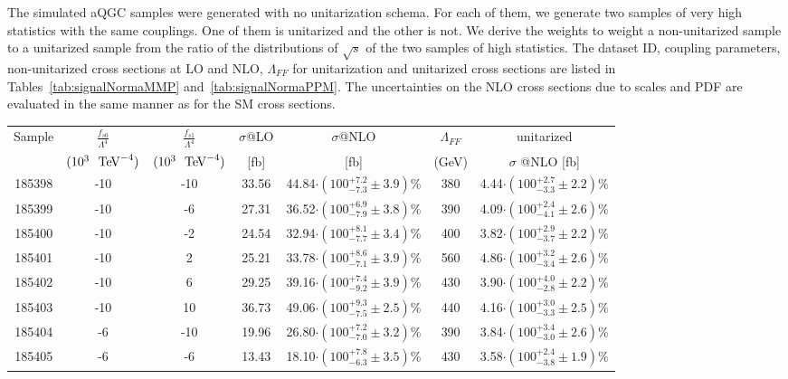 The simulated aQGC samples were generated with no unitarization schema. For
each of them, we generate two samples of very high statistics with the
same couplings. One of them is unitarized and the other is not. We
derive the weights to weight a non-unitarized sample to a unitarized
sample from the ratio of the distributions of $\sqrt{s}$ of the two
samples of high statistics. The dataset ID, coupling parameters,
non-unitarized cross sections at LO and NLO, $\Lambda_{FF}$ for
unitarization and unitarized cross sections are listed in
Tables~\ref{tab:signalNormaMMP} and~\ref{tab:signalNormaPPM}. The uncertainties on the NLO cross
sections due to scales and PDF are evaluated in the same manner as for
the SM cross sections.
\begin{table}[ht!]
  \centering
  {
\renewcommand{\arraystretch}{1.3}
\begin{tabular}{c|c|c|c|c|c|c}
  \hline
  Sample & $\frac{f_{s0}}{\Lambda^4} $ & $\frac{f_{s1}}{\Lambda^4} $ & $\sigma$@LO  & $\sigma$@NLO & $\Lambda_{FF}$  & unitarized  \\
     & $(10^3~\TeV^{-4})$ & $(10^3~\TeV^{-4})$ & [fb] & [fb] &  (GeV) & $\sigma$ @NLO [fb] \\
\hline \hline
185398 & -10 &	-10 & 33.56 &         44.84$\cdot (100^{+7.2}_{-7.3}\pm3.9  )$\% &           380    &       4.44$\cdot (100^{+2.7}_{-3.3}\pm 2.2)\%$ \\
185399 &  -10 &	-6  &     27.31 &     36.52$\cdot (100^{+6.9}_{-7.9}\pm 3.8 )$\% &      390   &        4.09$\cdot (100^{+2.4}_{-4.1}\pm 2.6 )\%$  \\
185400 &  -10  &  -2  &  24.54  &     32.94$\cdot (100^{+8.1}_{-7.7}\pm3.4  )$\%  &     400      &            3.82$\cdot (100^{+2.9}_{-3.7}\pm 2.2)$\% \\ 
185401 & -10   &  2   &  25.21   &    33.78$\cdot (100^{+8.6}_{-7.1}\pm3.9 )$\%   &    560       &           4.86$\cdot (100^{+3.2}_{-3.4}\pm 2.6)$\%\\ 
185402 & -10   &  6   &  29.25   &    39.16$\cdot (100^{+7.4}_{-9.2}\pm3.9  )$\%   &    430       &           3.90$\cdot (100^{+4.0}_{-2.8}\pm 2.2)$\%\\
185403 & -10   &  10  &  36.73   &    49.06$\cdot (100^{+9.3}_{-7.5}\pm2.5 )$\%   &    440       &           4.16$\cdot (100^{+3.0}_{-3.3}\pm 2.5 )$\% \\
\hline
185404 & -6    &  -10 &  19.96   &    26.80$\cdot (100^{+7.2}_{-7.0}\pm 3.2 )$\%    &   390       &           3.84$\cdot (100^{+3.4}_{-3.0}\pm 2.6)$\% \\ 
185405 & -6    &  -6  &  13.43   &    18.10$\cdot (100^{+7.8}_{-6.3}\pm 3.5 )$\%    &   430       &           3.58$\cdot (100^{+2.4}_{-3.8}\pm 1.9)$\% \\

\end{tabular}}
\end{table}
